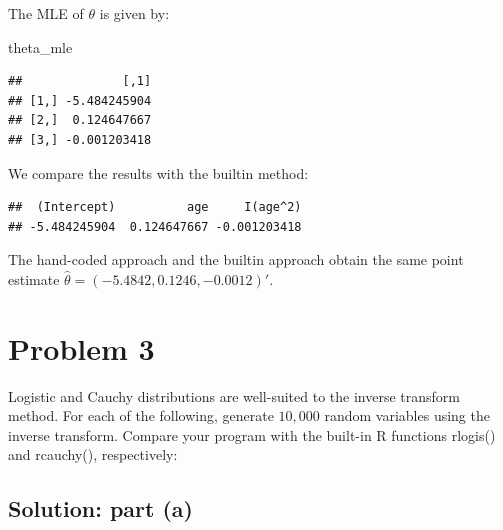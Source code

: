 \documentclass[
]{article}
\newenvironment{Shaded}{\begin{snugshade}}{\end{snugshade}}
\newcommand{\AttributeTok}[1]{\textcolor[rgb]{0.13,0.29,0.53}{#1}}
\newcommand{\DecValTok}[1]{\textcolor[rgb]{0.00,0.00,0.81}{#1}}
\newcommand{\FunctionTok}[1]{\textcolor[rgb]{0.13,0.29,0.53}{\textbf{#1}}}
\newcommand{\NormalTok}[1]{#1}
\newcommand{\SpecialCharTok}[1]{\textcolor[rgb]{0.81,0.36,0.00}{\textbf{#1}}}
\newcommand{\StringTok}[1]{\textcolor[rgb]{0.31,0.60,0.02}{#1}}
\begin{document}
The MLE of \(\theta\) is given by:

\begin{Shaded}
\begin{Highlighting}[]
\NormalTok{theta\_mle}
\end{Highlighting}
\end{Shaded}

\begin{verbatim}
##              [,1]
## [1,] -5.484245904
## [2,]  0.124647667
## [3,] -0.001203418
\end{verbatim}

We compare the results with the builtin method:

\begin{Shaded}
\end{Shaded}

\begin{verbatim}
##  (Intercept)          age     I(age^2) 
## -5.484245904  0.124647667 -0.001203418
\end{verbatim}

The hand-coded approach and the builtin approach obtain the same point
estimate \(\hat\theta = (-5.4842, 0.1246, -0.0012)'\).

\hypertarget{problem-3}{%
\section{Problem 3}\label{problem-3}}

Logistic and Cauchy distributions are well-suited to the inverse
transform method. For each of the following, generate \(10,000\) random
variables using the inverse transform. Compare your program with the
built-in R functions rlogis() and rcauchy(), respectively:

\hypertarget{solution-part-a}{%
\subsection{Solution: part (a)}\label{solution-part-a}}
\end{document}
